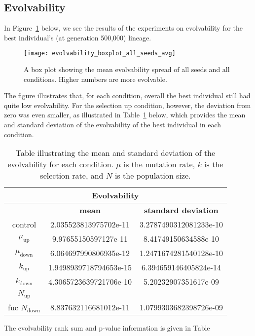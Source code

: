 \subsection{Evolvability}
In Figure~\ref{fig:evolvability_mean} below, we see the results of the experiments on evolvability for the best individual's (at generation 500,000) lineage. 
\begin{figure}[H]
	\centering
	\texttt{[image: evolvability\_boxplot\_all\_seeds\_avg]}
	\caption[Evolvability boxplot]{A box plot showing the mean evolvability spread of all seeds and all conditions. Higher numbers are more evolvable.}
	\label{fig:evolvability_mean}	
\end{figure}
The figure illustrates that, for each condition, overall the best individual still had quite low evolvability. For the selection up condition, however, the deviation from zero was even smaller, as illustrated in Table~\ref{table:mean_std_dev_evolvability} below, which provides the mean and standard deviation of the evolvability of the best individual in each condition. 

\begin{table}[H]
	\centering
	\begin{tabular}{| c | c | c |}
		\hline
		\multicolumn{3}{|c|}{\Large Evolvability} \\
		\hline
		 & \textbf{mean} & \textbf{standard deviation}\\
		 \hline
		 \hline
		 control & 2.035523813975702e-11 & 3.2787490312081233e-10\\
		 \hline
		 $\mu_\text{up}$ & 9.97655150597127e-11 & 8.41749150634588e-10 \\
		 \hline
		 $\mu_\text{down}$ & 6.064697990806935e-12 & 1.2471674281540128e-10 \\
		 \hline
		 $k_\text{up}$ & 1.9498939718794653e-15 & 6.394659146405824e-14 \\
		 \hline
		 $k_\text{down}$ & 4.3065723639721706e-10 & 5.20232907351617e-09 \\
		 \hline
		 $N_\text{up}$ &  & \\
		 \hline fuc
		 $N_\text{down}$ & 8.837632116681012e-11 &  1.0799303682398726e-09 \\
		
		 \hline	 		 
	\end{tabular}
	\caption[Evolvability mean and standard deviation]{Table illustrating the mean and standard deviation of the evolvability for each condition. $\mu$ is the mutation rate, $k$ is the selection rate, and $N$ is the population size.}
	\label{table:mean_std_dev_evolvability}
\end{table}
The evolvability rank sum and p-value information is given in Table~

